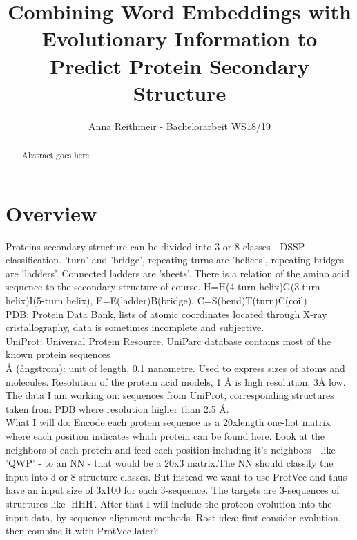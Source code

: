 \documentclass{article}
\title{Combining Word Embeddings with Evolutionary Information to Predict Protein Secondary Structure}
\author{Anna Reithmeir - Bachelorarbeit WS18/19}
\begin{document}
\maketitle
\begin{abstract}
Abstract goes here
\end{abstract}
\section{Overview}

Proteins secondary structure can be divided into 3 or 8 classes - DSSP classification. 'turn' and 'bridge', repeating turns are 'helices', repeating bridges are 'ladders'. Connected ladders are 'sheets'. There is a relation of the amino acid sequence to the secondary structure of course. H=H(4-turn helix)G(3.turn helix)I(5-turn helix), E=E(ladder)B(bridge), C=S(bend)T(turn)C(coil)\\

PDB: Protein Data Bank, lists of atomic coordinates located through X-ray cristallography, data is sometimes incomplete and subjective.\\

UniProt: Universal Protein Resource. UniParc database contains most of the known protein sequences\\

Å (ångstrom): unit of length, 0.1 nanometre. Used to express sizes of atoms and molecules. Resolution of the protein acid models, 1 Å is high resolution, 3Å low. \\

The data I am working on: sequences from UniProt, corresponding structures taken from PDB where resolution higher than 2.5 Å.\\

What I will do: Encode each protein sequence as a 20xlength one-hot matrix where each position indicates which protein can be found here. Look at the neighbors of each protein and feed each position including it's neighbors - like 'QWP' - to an NN - that would be a 20x3 matrix.The NN should classify the input into 3 or 8 structure classes. But instead we want to use ProtVec and thus have an input size of 3x100 for each 3-sequence. The targets are 3-sequences of structures like 'HHH'. After that I will include the proteon evolution into the input data, by sequence alignment methods. Rost idea: first consider evolution, then combine it with ProtVec later? \\
\end{document}
